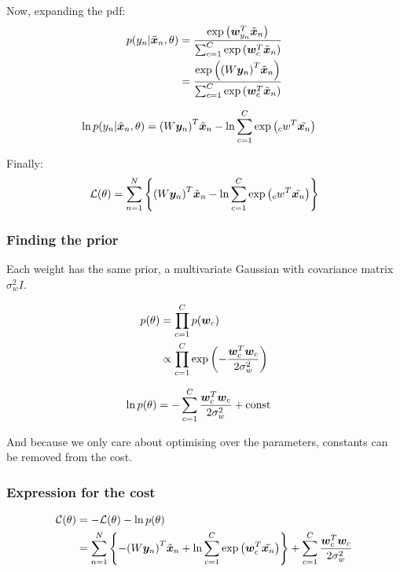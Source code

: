 \documentclass[../../main.tex]{subfiles}
\begin{document}
Now, expanding the pdf:
\begin{align*}
p(y_n | \tilde{\bm{x}}_n, \theta)
&=
\frac{\exp{\left( \bm{w} _{y_n}^T\tilde{ \bm{x} }_n\right)}}{\sum_{c=1}^C \exp{\left( \bm{w} _c^T\tilde{ \bm{x} }_n\right)} } \\
&=
\frac{\exp{\left({(W \bm{y} _n)}^T\tilde{ \bm{x} }_n\right)}}{\sum_{c=1}^C \exp{\left( \bm{w} _c^T\tilde{ \bm{x} }_n\right)} }
\end{align*}

\begin{align*}
\ln p(y_n | \tilde{\bm{x}}_n, \theta)
&=
{(W\bm{y}_n)}^T\tilde{\bm{x}}_n - \ln \sum_{c=1}^C \exp{\left( \bm{_} c{w}^T\tilde{ \bm{x} _n}\right)}
\end{align*}

Finally:
\[ \mathcal{L}(\theta) =
\sum_{n=1}^N \left\{{(W\bm{y}_n)}^T\tilde{\bm{x}}_n - \ln \sum_{c=1}^C \exp{\left( \bm{_} c{w}^T\tilde{ \bm{x} _n}\right)} \right\}
\]

\subsubsection{Finding the prior}

Each weight has the same prior, a multivariate Gaussian with covariance matrix $\sigma_w^2I$.

\begin{align*}
p(\theta) &= \prod_{c=1}^C p(\bm{w}_c) \\
          &\propto \prod_{c=1}^C \exp{\left(-\frac{ \bm{w} _c^T \bm{w} _c}{2\sigma_w^2}\right)}
\end{align*}

\begin{align*}
    \ln p(\theta) &= - \sum_{c=1}^C \frac{\bm{w}_c^T\bm{w}_c}{2\sigma_w^2} + \textrm{const}
\end{align*}

And because we only care about optimising over the parameters, constants can be removed from the cost.

\subsubsection{Expression for the cost}

\begin{align*}
\mathcal{C}(\theta)
&=
- \mathcal{L}(\theta) - \ln p(\theta) \\
&=
\sum_{n=1}^N \left\{-{(W\bm{y}_n)}^T\tilde{\bm{x}}_n + \ln \sum_{c=1}^C \exp{\left( \bm{w} _c^T\tilde{ \bm{x} _n}\right)} \right\}
+ \sum_{c=1}^C \frac{\bm{w}_c^T\bm{w}_c}{2\sigma_w^2}
\end{align*}
\end{document}
